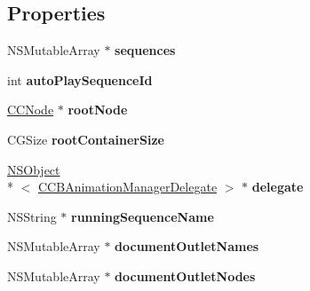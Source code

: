 \subsection*{Properties}
\begin{DoxyCompactItemize}
\item 
\hypertarget{interface_c_c_b_animation_manager_af69ff36d05ffa37265b380cf47d57400}{N\-S\-Mutable\-Array $\ast$ {\bfseries sequences}}\label{interface_c_c_b_animation_manager_af69ff36d05ffa37265b380cf47d57400}

\item 
\hypertarget{interface_c_c_b_animation_manager_aeac01339572b60b0fdf1bdc27d4b26cc}{int {\bfseries auto\-Play\-Sequence\-Id}}\label{interface_c_c_b_animation_manager_aeac01339572b60b0fdf1bdc27d4b26cc}

\item 
\hypertarget{interface_c_c_b_animation_manager_aae68fa43ac4190cb5cd5f2f77445ff03}{\hyperlink{class_c_c_node}{C\-C\-Node} $\ast$ {\bfseries root\-Node}}\label{interface_c_c_b_animation_manager_aae68fa43ac4190cb5cd5f2f77445ff03}

\item 
\hypertarget{interface_c_c_b_animation_manager_a46b6479cc186562eac13bee8bd82d022}{C\-G\-Size {\bfseries root\-Container\-Size}}\label{interface_c_c_b_animation_manager_a46b6479cc186562eac13bee8bd82d022}

\item 
\hypertarget{interface_c_c_b_animation_manager_a87ba5affdbbcd73844eb09f5baf98576}{\hyperlink{class_n_s_object}{N\-S\-Object}\\*
$<$ \hyperlink{protocol_c_c_b_animation_manager_delegate-p}{C\-C\-B\-Animation\-Manager\-Delegate} $>$ $\ast$ {\bfseries delegate}}\label{interface_c_c_b_animation_manager_a87ba5affdbbcd73844eb09f5baf98576}

\item 
\hypertarget{interface_c_c_b_animation_manager_a2354887b2ee1ae12d8069f8aec9d8c94}{N\-S\-String $\ast$ {\bfseries running\-Sequence\-Name}}\label{interface_c_c_b_animation_manager_a2354887b2ee1ae12d8069f8aec9d8c94}

\item 
\hypertarget{interface_c_c_b_animation_manager_a223716f1b6ebfd4f244103ee153f50c6}{N\-S\-Mutable\-Array $\ast$ {\bfseries document\-Outlet\-Names}}\label{interface_c_c_b_animation_manager_a223716f1b6ebfd4f244103ee153f50c6}

\item 
\hypertarget{interface_c_c_b_animation_manager_af49830291c425c39cb50a1b8ae02f653}{N\-S\-Mutable\-Array $\ast$ {\bfseries document\-Outlet\-Nodes}}\label{interface_c_c_b_animation_manager_af49830291c425c39cb50a1b8ae02f653}


\end{DoxyCompactItemize}
